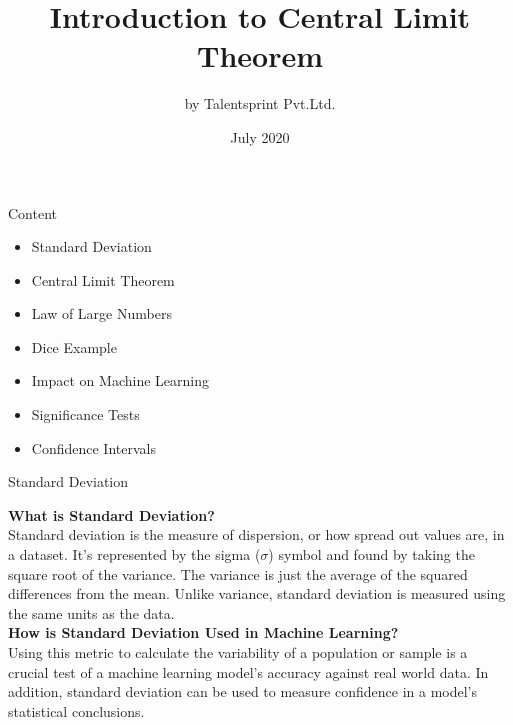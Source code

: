 \documentclass{beamer}
\title{Introduction to Central Limit Theorem}
\author{by Talentsprint Pvt.Ltd.}
\date{July 2020}
\begin{document}
\maketitle
\begin{frame}{Content}
	\begin{itemize}
		\item Standard Deviation
		\item Central Limit Theorem
		\item Law of Large Numbers
		\item Dice Example
		\item Impact on Machine Learning
		\item Significance Tests
		\item Confidence Intervals
	\end{itemize}
\end{frame}

\begin{frame}{Standard Deviation}
\begin{flushleft}
\textbf{What is Standard Deviation?} \\
\vspace{10pt}
	Standard deviation is the measure of dispersion, or how spread out values are, in a dataset. It’s represented by the sigma ($\sigma$) symbol and found by taking the square root of the variance. The variance is just the average of the squared differences from the mean. Unlike variance, standard deviation is measured using the same units as the data.
\vspace{10pt} \\
\textbf{How is Standard Deviation Used in Machine Learning?}\\
\vspace{10pt}
	Using this metric to calculate the variability of a population or sample is a crucial test of a machine learning model’s accuracy against real world data. In addition, standard deviation can be used to measure confidence in a model’s statistical conclusions.
\end{flushleft}
\end{frame}
\end{document}
